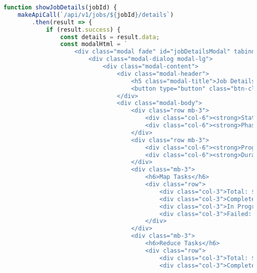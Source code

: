 \documentclass[12pt,a4paper]{article}
\begin{document}
\begin{lstlisting}[language=javascript, caption=Modal Job Details]
function showJobDetails(jobId) {
    makeApiCall(`/api/v1/jobs/${jobId}/details`)
        .then(result => {
            if (result.success) {
                const details = result.data;
                const modalHtml = `
                    <div class="modal fade" id="jobDetailsModal" tabindex="-1">
                        <div class="modal-dialog modal-lg">
                            <div class="modal-content">
                                <div class="modal-header">
                                    <h5 class="modal-title">Job Details: ${details.id}</h5>
                                    <button type="button" class="btn-close" data-bs-dismiss="modal"></button>
                                </div>
                                <div class="modal-body">
                                    <div class="row mb-3">
                                        <div class="col-6"><strong>Status:</strong> ${details.status}</div>
                                        <div class="col-6"><strong>Phase:</strong> ${details.phase}</div>
                                    </div>
                                    <div class="row mb-3">
                                        <div class="col-6"><strong>Progress:</strong> ${details.progress}%</div>
                                        <div class="col-6"><strong>Duration:</strong> ${Math.floor((Date.now() - new Date(details.start_time)) / 1000)}s</div>
                                    </div>
                                    <div class="mb-3">
                                        <h6>Map Tasks</h6>
                                        <div class="row">
                                            <div class="col-3">Total: ${details.map_tasks.total}</div>
                                            <div class="col-3">Completed: ${details.map_tasks.completed}</div>
                                            <div class="col-3">In Progress: ${details.map_tasks.in_progress}</div>
                                            <div class="col-3">Failed: ${details.map_tasks.failed}</div>
                                        </div>
                                    </div>
                                    <div class="mb-3">
                                        <h6>Reduce Tasks</h6>
                                        <div class="row">
                                            <div class="col-3">Total: ${details.reduce_tasks.total}</div>
                                            <div class="col-3">Completed: ${details.reduce_tasks.completed}</div>

\end{lstlisting}
\end{document}
